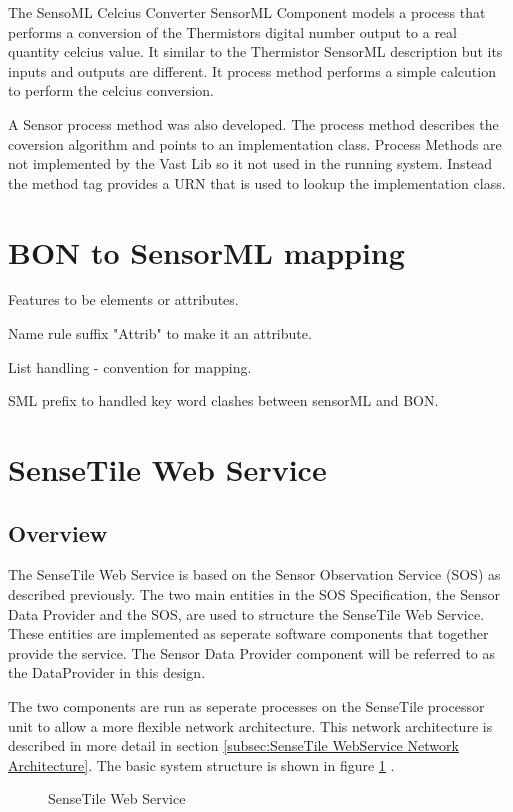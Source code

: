 \documentclass[]{final_report}
\begin{document}
The SensoML Celcius Converter SensorML Component  models a process that performs a conversion of the Thermistors digital number output to a real quantity celcius value. It similar to the Thermistor SensorML description but its inputs and outputs are different. It process method performs a simple calcution to perform the celcius conversion.

A Sensor process method was also developed. The process method describes the coversion algorithm and points to an implementation class. Process Methods are not implemented by the Vast Lib so it not used in the running system. Instead the method tag provides a URN that is used to lookup the implementation class.

\section{BON to SensorML mapping}
Features to be elements or attributes.

Name rule suffix "Attrib" to make it an attribute.

List handling - convention for mapping.

SML prefix to handled key word clashes between sensorML and BON.


\section{SenseTile Web Service}
\subsection{Overview}

The SenseTile Web Service is based on the Sensor Observation Service (SOS) as described previously. The two main entities in the SOS Specification, the Sensor Data Provider and the SOS,  are used to structure the SenseTile Web Service. These entities are implemented as seperate software components that together provide the service. The Sensor Data Provider component will be referred to as the DataProvider in this design.

The two components are run as seperate processes on the SenseTile processor unit to allow a more flexible network architecture.  This network architecture is described in more detail in section \ref{subsec:SenseTile WebService Network Architecture}. The basic system structure is shown in figure \ref {fig:Deployment_sensetile} .

\begin{figure}[h]
\caption{SenseTile Web Service}\label{fig:Deployment_sensetile}
\end{figure}
\end{document}
